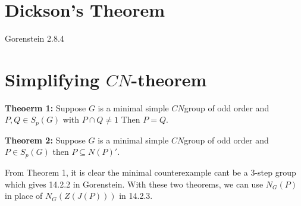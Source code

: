 \section{Dickson's Theorem}
Gorenstein 2.8.4
\section{Simplifying $CN$-theorem}

{\bf Theoerm 1:} Suppose $G$ is a minimal simple $CN$group of odd order and $P, Q \in S_p(G)$ with
$P \cap Q \ne 1$  Then $P=Q$.
\begin{quote}
\end{quote}
{\bf Theorem 2:} Suppose $G$ is a minimal simple $CN$group of odd order and $P \in S_p(G)$ then
$P \subseteq N(P)'$.
\begin{quote}
\end{quote}
From Theorem 1, it is clear the minimal counterexample cant be a $3$-step group which gives 14.2.2 
in Gorenstein.  With these two theorems, we can use $N_G(P)$ in place of $N_G(Z(J(P)))$ in 14.2.3.
